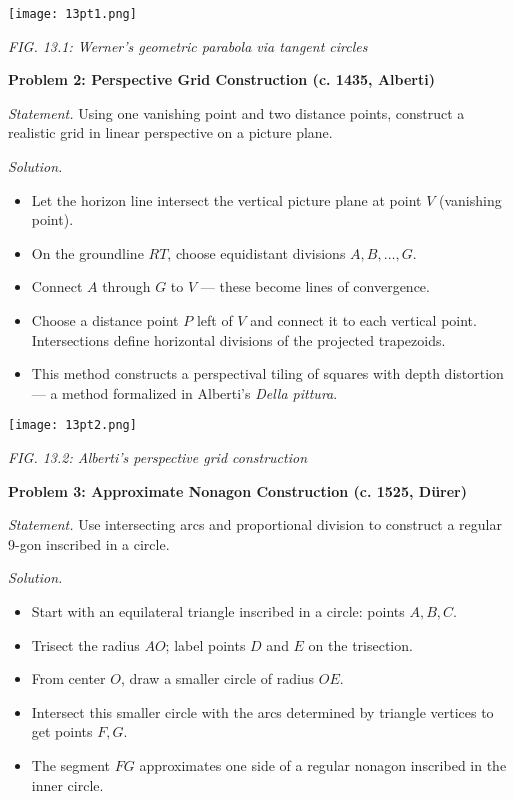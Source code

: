 \documentclass[9pt]{article}
\begin{document}
\begin{center}
    \texttt{[image: 13pt1.png]}

    \textit{FIG. 13.1: Werner’s geometric parabola via tangent circles}
\end{center}

\newpage

\textbf{Problem 2: Perspective Grid Construction (c. 1435, Alberti)}

\textit{Statement.} Using one vanishing point and two distance points, construct a realistic grid in linear perspective on a picture plane.

\textit{Solution.}
\begin{itemize}
    \item Let the horizon line intersect the vertical picture plane at point $V$ (vanishing point).
    \item On the groundline $RT$, choose equidistant divisions $A, B, \dots, G$.
    \item Connect $A$ through $G$ to $V$ — these become lines of convergence.
    \item Choose a distance point $P$ left of $V$ and connect it to each vertical point. Intersections define horizontal divisions of the projected trapezoids.
    \item This method constructs a perspectival tiling of squares with depth distortion — a method formalized in Alberti’s \textit{Della pittura}.
\end{itemize}

\begin{center}
    \texttt{[image: 13pt2.png]}

    \textit{FIG. 13.2: Alberti’s perspective grid construction}
\end{center}

\newpage

\textbf{Problem 3: Approximate Nonagon Construction (c. 1525, Dürer)}

\textit{Statement.} Use intersecting arcs and proportional division to construct a regular 9-gon inscribed in a circle.

\textit{Solution.}
\begin{itemize}
    \item Start with an equilateral triangle inscribed in a circle: points $A, B, C$.
    \item Trisect the radius $AO$; label points $D$ and $E$ on the trisection.
    \item From center $O$, draw a smaller circle of radius $OE$.
    \item Intersect this smaller circle with the arcs determined by triangle vertices to get points $F, G$.
    \item The segment $FG$ approximates one side of a regular nonagon inscribed in the inner circle.
\end{itemize}
\end{document}
